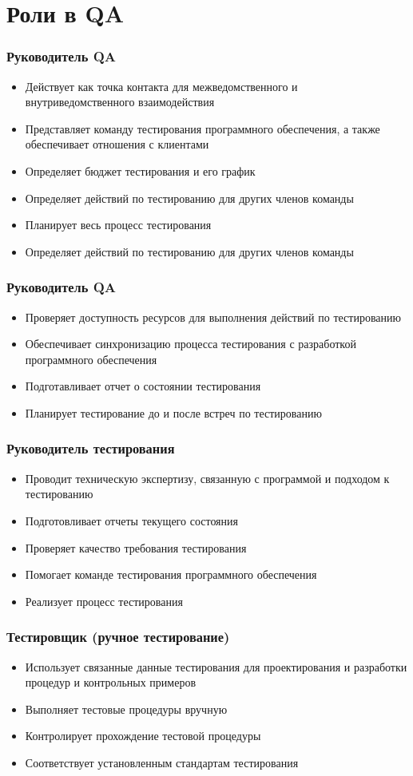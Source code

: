 \documentclass{../industrial-development}
\begin{document}
\section{Роли в QA}
	\begin{frame} \frametitle{Руководитель QA}
		\begin{itemize}
			\item Действует как точка контакта для межведомственного и внутриведомственного взаимодействия
			\item Представляет команду тестирования программного обеспечения, а также обеспечивает отношения с клиентами
			\item Определяет бюджет тестирования и его график
			\item Определяет действий по тестированию для других членов команды
			\item Планирует весь процесс тестирования
			\item Определяет действий по тестированию для других членов команды
		\end{itemize}
	\end{frame}
	\begin{frame} \frametitle{Руководитель QA}
		\begin{itemize}
			\item Проверяет доступность ресурсов для выполнения действий по тестированию
			\item Обеспечивает синхронизацию процесса тестирования с разработкой программного обеспечения
			\item Подготавливает отчет о состоянии тестирования
			\item Планирует тестирование до и после встреч по тестированию
		\end{itemize}
	\end{frame}
	\begin{frame} \frametitle{Руководитель тестирования}
		\begin{itemize}
			\item Проводит техническую экспертизу, связанную с программой и подходом к тестированию
			\item Подготовливает отчеты текущего состояния
			\item Проверяет качество требования тестирования
			\item Помогает команде тестирования программного обеспечения
			\item Реализует процесс тестирования
		\end{itemize}
	\end{frame}
	\begin{frame} \frametitle{Тестировщик (ручное тестирование)}
		\begin{itemize}
			\item Использует связанные данные тестирования для проектирования и разработки процедур и контрольных примеров
			\item Выполняет тестовые процедуры вручную
			\item Контролирует прохождение тестовой процедуры
			\item Соответствует установленным стандартам тестирования
		\end{itemize}
	\end{frame}
\end{document}
